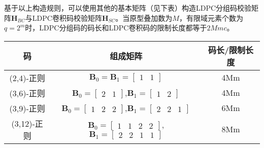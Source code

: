 基于以上构造规则，可以使用其他的基本矩阵（见下表）构造LDPC分组码校验矩阵$\mathbf{H}_{BC}$与LDPC卷积码校验矩阵$\mathbf{H}_{SC}$。当原型叠加数为$M$，有限域元素个数为$q=2^m$时，LDPC分组码的码长和LDPC卷积码的限制长度都等于$2Mmc$。
\begin{center}
\begin{tabular}{c|c|c}
 \hline
码 & 组成矩阵 &码长/限制长度 \\ \hline
(2,4)-正则 & 
$\mathbf{B}_0 = \mathbf{B}_1 = [\begin{array}{cc} 1&1 \end{array}]$ & 4Mm \\ \hline
(3,6)-正则 & 
 $\mathbf{B}_0 = [\begin{array}{cc} 2&1 \end{array}]$,$\mathbf{B}_1 = [\begin{array}{cc} 1&2 \end{array}]$ & 4Mm \\ \hline
(3,9)-正则 & 
 $\mathbf{B}_0 = [\begin{array}{ccc} 1&2&2 \end{array}]$,$\mathbf{B}_1 = [\begin{array}{ccc} 2&2&1 \end{array}]$ & 6Mm \\ \hline
(3,12)-正则 & 
 $\mathbf{B}_0 = [\begin{array}{cccc} 1&1&2&2 \end{array}]$,$\mathbf{B}_1 = [\begin{array}{cccc} 2&2&1&1 \end{array}]$ & 8Mm \\ \hline

\end{tabular}
\end{center}
